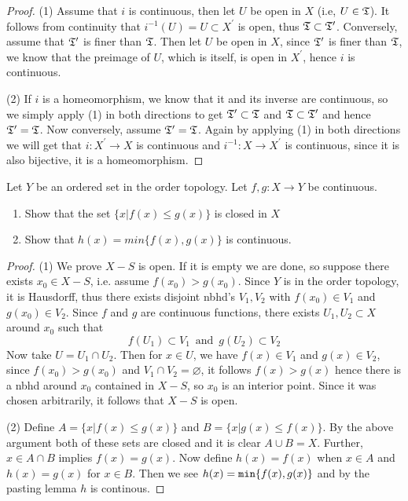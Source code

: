     \begin{proof}
        (1) Assume that $i$ is continuous, then let $U$ be open in $X$ (i.e, $U \in \mathfrak{T}$). It follows from continuity that $i^{-1}(U) = U \subset X^\prime$ is open, thus 
        $\mathfrak{T} \subset \mathfrak{T}^\prime$. Conversely, assume that $\mathfrak{T}^\prime $ is finer than $\mathfrak{T}$. Then let $U$ be open in $X$, since $\mathfrak{T}^\prime$ is finer than $\mathfrak{T}$, we know that the preimage of $U$, which is itself, 
        is open in $X^\prime$, hence $i$ is continuous. 

        (2) If $i$ is a homeomorphism, we know that it and its inverse are continuous, 
        so we simply apply (1) in both directions to get $\mathfrak{T}^\prime \subset \mathfrak{T}$ and $\mathfrak{T} \subset \mathfrak{T}^\prime$ and hence $\mathfrak{T}^\prime = \mathfrak{T}$. Now conversely, assume $\mathfrak{T}^\prime = \mathfrak{T}$. Again by applying (1) in both directions 
        we will get that $i:X^\prime \to X$ is continuous and $i^{-1}:X \to X^\prime$ is continuous, since it is also bijective, it is a homeomorphism. 
    \end{proof}



    \question 
    Let $Y$ be an ordered set in the order topology. Let $f,g:X \to Y$ be continuous. 
    \begin{enumerate}
        \item Show that the set $\{x|f(x) \leq g(x) \} $ is closed in $X$
        \item Show that $h(x) = min\{f(x), g(x) \}$ is continuous.
    \end{enumerate}

    \begin{proof}
        (1) We prove $X -S$ is open. If it is empty we are done, so suppose there exists $x_0 \in X - S$, i.e. assume 
        $f(x_0) > g(x_0)$. Since $Y$ is in the order topology, it is Hausdorff, thus there exists disjoint nbhd's $V_1, V_2$ with 
        $f(x_0) \in V_1$ and $g(x_0) \in V_2$. Since $f$ and $g$ are continuous functions, there exists $U_1, U_2 \subset X$ around $x_0$ such that 
        \[f(U_1) \subset V_1 \, \text{ and } \, g(U_2) \subset V_2\]
        Now take $U = U_1 \cap U_2$. Then for $x \in U$, we have $f(x) \in V_1 $ and $g(x) \in V_2$, since $f(x_0)> g(x_0)$ and $V_1 \cap V_2 = \varnothing$, 
        it follows $f(x) > g(x)$ hence there is a nbhd around $x_0$ contained in $X-S$, so $x_0$ is an interior point. Since it was chosen arbitrarily, it follows that 
        $X - S$ is open. 


        (2) 
        Define $A = \{x|f(x) \leq g(x) \}$ and $B = \{x|g(x) \leq f(x) \}$. By the above argument both of these sets are closed and it is clear $A \cup B = X$. Further,  $x \in A \cap B$ implies $f(x) = g(x)$.
        Now define $h(x) = f(x)$ when $x \in A$ and $h(x) = g(x)$ for $x \in B$. Then we see $h(x) = {\tt min}\{f(x), g(x)\}$ and by the pasting lemma $h$ is continous. 
       \end{proof}


